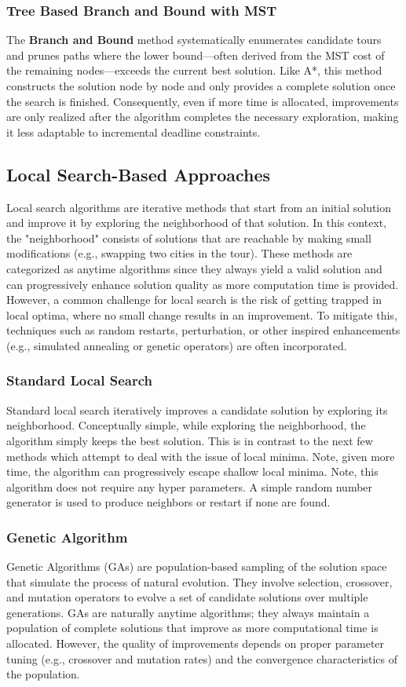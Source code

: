 \documentclass[11pt]{article}
\begin{document}
	\subsubsection{Tree Based Branch and Bound with MST}
	The \textbf{Branch and Bound} method systematically enumerates candidate tours and prunes paths where the lower bound—often derived from the MST cost of the remaining nodes—exceeds the current best solution. Like A*, this method constructs the solution node by node and only provides a complete solution once the search is finished. Consequently, even if more time is allocated, improvements are only realized after the algorithm completes the necessary exploration, making it less adaptable to incremental deadline constraints.

	\subsection{Local Search-Based Approaches}
	Local search algorithms are iterative methods that start from an initial solution and improve it by exploring the neighborhood of that solution. In this context, the "neighborhood" consists of solutions that are reachable by making small modifications (e.g., swapping two cities in the tour). These methods are categorized as anytime algorithms since they always yield a valid solution and can progressively enhance solution quality as more computation time is provided. However, a common challenge for local search is the risk of getting trapped in local optima, where no small change results in an improvement. To mitigate this, techniques such as random restarts, perturbation, or other inspired enhancements (e.g., simulated annealing or genetic operators) are often incorporated.
	
	\subsubsection{Standard Local Search}
	Standard local search iteratively improves a candidate solution by exploring its neighborhood. Conceptually simple, while exploring the neighborhood, the algorithm simply keeps the best solution. This is in contrast to the next few methods which attempt to deal with the issue of local minima. Note, given more time, the algorithm can progressively escape shallow local minima. Note, this algorithm does not require any hyper parameters. A simple random number generator is used to produce neighbors or restart if none are found.
	
	\subsubsection{Genetic Algorithm}
	Genetic Algorithms (GAs) are population-based sampling of the solution space that simulate the process of natural evolution. They involve selection, crossover, and mutation operators to evolve a set of candidate solutions over multiple generations. GAs are naturally anytime algorithms; they always maintain a population of complete solutions that improve as more computational time is allocated. However, the quality of improvements depends on proper parameter tuning (e.g., crossover and mutation rates) and the convergence characteristics of the population.
	
\end{document}
